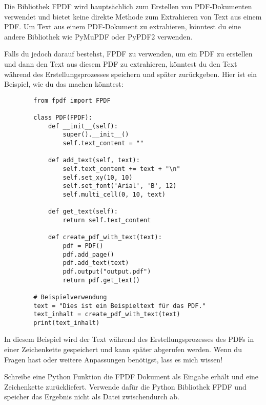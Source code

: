 \begin{tcolorbox}[
	enhanced,
	breakable,
	colback=BhtGrey!5!white,
	colframe=BhtGrey!75!black!50,
	title= Copilot
	]
	Die Bibliothek FPDF wird hauptsächlich zum Erstellen von PDF-Dokumenten verwendet und bietet keine direkte Methode zum Extrahieren von Text aus einem PDF. Um Text aus einem PDF-Dokument zu extrahieren, könntest du eine andere Bibliothek wie PyMuPDF oder PyPDF2 verwenden.
	
	Falls du jedoch darauf bestehst, FPDF zu verwenden, um ein PDF zu erstellen und dann den Text aus diesem PDF zu extrahieren, könntest du den Text während des Erstellungsprozesses speichern und später zurückgeben. Hier ist ein Beispiel, wie du das machen könntest:
	\begin{verbatim}
		from fpdf import FPDF
		
		class PDF(FPDF):
		    def __init__(self):
		        super().__init__()
		        self.text_content = ""
		
		    def add_text(self, text):
		        self.text_content += text + "\n"
		        self.set_xy(10, 10)
		        self.set_font('Arial', 'B', 12)
		        self.multi_cell(0, 10, text)
		
		    def get_text(self):
		        return self.text_content
		
		    def create_pdf_with_text(text):
		        pdf = PDF()
	            pdf.add_page()
		        pdf.add_text(text)
		        pdf.output("output.pdf")
		        return pdf.get_text()
		
		# Beispielverwendung
		text = "Dies ist ein Beispieltext für das PDF."
		text_inhalt = create_pdf_with_text(text)
		print(text_inhalt)
	\end{verbatim}
	In diesem Beispiel wird der Text während des Erstellungsprozesses des PDFs in einer Zeichenkette gespeichert und kann später abgerufen werden. Wenn du Fragen hast oder weitere Anpassungen benötigst, lass es mich wissen!
\end{tcolorbox}

\newpage

\begin{tcolorbox}[
	enhanced,
	colback=BhtColorYellow!5!white,
	colframe=BhtColorYellow!75!black,
	title= Python Funktion
	]
	Schreibe eine Python Funktion die FPDF Dokument als Eingabe erhält und eine Zeichenkette zurückliefert. Verwende dafür die Python Bibliothek FPDF und speicher das Ergebnis nicht als Datei zwischendurch ab.
\end{tcolorbox}

